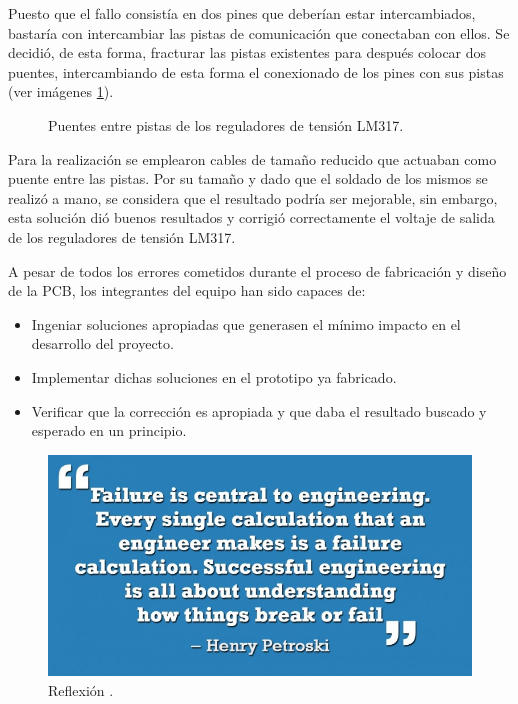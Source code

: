 \begin{itemize}
    Puesto que el fallo consistía en dos pines que deberían estar intercambiados, bastaría con intercambiar las pistas de comunicación que conectaban con ellos. Se decidió, de esta forma, fracturar las pistas existentes para después colocar dos puentes, intercambiando de esta forma el conexionado de los pines con sus pistas (ver imágenes \ref{fig:puentes}).
    
    \begin{figure}[H]
    \centering
    \hfill
    \caption{Puentes entre pistas de los reguladores de tensión LM317.}
    \label{fig:puentes}
    \end{figure}
    
    Para la realización se emplearon cables de tamaño reducido que actuaban como puente entre las pistas. Por su tamaño y dado que el soldado de los mismos se realizó a mano, se considera que el resultado podría ser mejorable, sin embargo, esta solución dió buenos resultados y corrigió correctamente el voltaje de salida de los reguladores de tensión LM317.
    
\end{itemize}

A pesar de todos los errores cometidos durante el proceso de fabricación y diseño de la \ac{PCB}, los integrantes del equipo han sido capaces de: 

\begin{itemize}
    \item Ingeniar soluciones apropiadas que generasen el mínimo impacto en el desarrollo del proyecto.
    \item Implementar dichas soluciones en el prototipo ya fabricado.
    \item Verificar que la corrección es apropiada y que daba el resultado buscado y esperado en un principio.
\end{itemize}

 \begin{figure}[H]
    \centering 
    \includegraphics[width=0.5\linewidth]{pictures/Quote.jpg}
    \caption{Reflexión \cite{interestingengineering10BestEngineering}.}
 \end{figure}


